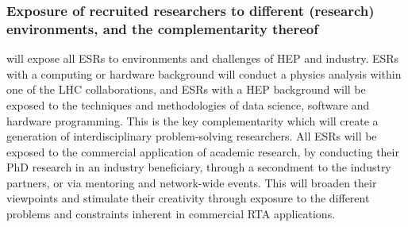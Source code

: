 \vspace{-2mm}
\subsubsection{Exposure of recruited researchers to different (research) environments, and the complementarity thereof}
\label{sec:exposureComplementarity}

\acronym will expose all ESRs to environments and challenges of HEP and industry. ESRs with 
a computing or hardware background will conduct a physics analysis within one 
of the LHC collaborations, and ESRs with a HEP background will be exposed to 
the techniques and methodologies of data science, software and hardware programming.
This is the key complementarity which will create a generation of interdisciplinary problem-solving researchers.
All ESRs will be exposed to the commercial application of academic research, by conducting their PhD research in an industry beneficiary, 
through a secondment to the industry partners, or via mentoring and network-wide events. 
This will broaden their viewpoints and stimulate their creativity through exposure to
the different problems and constraints inherent in commercial RTA applications.


